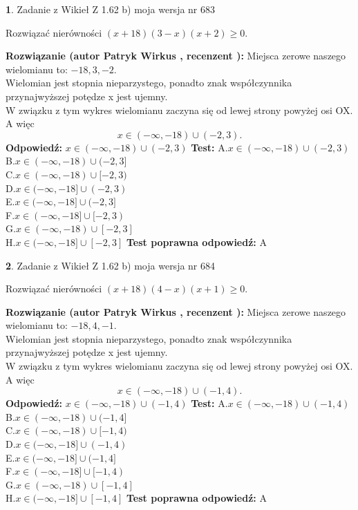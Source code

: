 \documentclass[12pt, a4paper]{article}
\theoremstyle{definition} %
\newtheorem{zad}{}
\newcommand{\zadStart}[1]{\begin{zad}#1\newline}
\newcommand{\zadStop}{\end{zad}}
\newcommand{\rozwStart}[2]{\noindent \textbf{Rozwiązanie (autor #1 , recenzent #2): }\newline}
\newcommand{\rozwStop}{\newline}
\newcommand{\odpStart}{\noindent \textbf{Odpowiedź:}\newline}
\newcommand{\odpStop}{\newline}
\newcommand{\testStart}{\noindent \textbf{Test:}\newline}
\newcommand{\testStop}{\newline}
\newcommand{\kluczStart}{\noindent \textbf{Test poprawna odpowiedź:}\newline}
\newcommand{\kluczStop}{\newline}
\begin{document}
\zadStart{Zadanie z Wikieł Z 1.62 b) moja wersja nr 683}

Rozwiązać nierówności $(x+18)(3-x)(x+2)\ge0$.
\zadStop
\rozwStart{Patryk Wirkus}{}
Miejsca zerowe naszego wielomianu to: $-18, 3, -2$.\\
Wielomian jest stopnia nieparzystego, ponadto znak współczynnika przy\linebreak najwyższej potędze x jest ujemny.\\ W związku z tym wykres wielomianu zaczyna się od lewej strony powyżej osi OX. A więc $$x \in (-\infty,-18) \cup (-2,3).$$
\rozwStop
\odpStart
$x \in (-\infty,-18) \cup (-2,3)$
\odpStop
\testStart
A.$x \in (-\infty,-18) \cup (-2,3)$\\
B.$x \in (-\infty,-18) \cup (-2,3]$\\
C.$x \in (-\infty,-18) \cup [-2,3)$\\
D.$x \in (-\infty,-18] \cup (-2,3)$\\
E.$x \in (-\infty,-18] \cup (-2,3]$\\
F.$x \in (-\infty,-18] \cup [-2,3)$\\
G.$x \in (-\infty,-18) \cup [-2,3]$\\
H.$x \in (-\infty,-18] \cup [-2,3]$
\testStop
\kluczStart
A
\kluczStop



\zadStart{Zadanie z Wikieł Z 1.62 b) moja wersja nr 684}

Rozwiązać nierówności $(x+18)(4-x)(x+1)\ge0$.
\zadStop
\rozwStart{Patryk Wirkus}{}
Miejsca zerowe naszego wielomianu to: $-18, 4, -1$.\\
Wielomian jest stopnia nieparzystego, ponadto znak współczynnika przy\linebreak najwyższej potędze x jest ujemny.\\ W związku z tym wykres wielomianu zaczyna się od lewej strony powyżej osi OX. A więc $$x \in (-\infty,-18) \cup (-1,4).$$
\rozwStop
\odpStart
$x \in (-\infty,-18) \cup (-1,4)$
\odpStop
\testStart
A.$x \in (-\infty,-18) \cup (-1,4)$\\
B.$x \in (-\infty,-18) \cup (-1,4]$\\
C.$x \in (-\infty,-18) \cup [-1,4)$\\
D.$x \in (-\infty,-18] \cup (-1,4)$\\
E.$x \in (-\infty,-18] \cup (-1,4]$\\
F.$x \in (-\infty,-18] \cup [-1,4)$\\
G.$x \in (-\infty,-18) \cup [-1,4]$\\
H.$x \in (-\infty,-18] \cup [-1,4]$
\testStop
\kluczStart
A
\kluczStop
\end{document}
